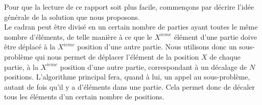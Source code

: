 Pour que la lecture de ce rapport soit plus facile, commençons par décrire l'idée générale de la solution que nous proposons. \\

Le cadran peut être divisé en un certain nombre de parties ayant toutes le même nombre d'éléments, de telle manière à ce que le $X^{ieme}$ élément d'une partie doive être déplacé à la $X^{ieme}$ position d'une autre partie. Nous utilisons donc un sous-problème qui nous permet de déplacer l'élément de la position $X$ de chaque partie, à la $X^{ieme}$ position d'une autre partie, correspondant à un décalage de $N$ positions. L'algorithme principal fera, quand à lui, un appel au sous-problème, autant de fois qu'il y a d'éléments dans une partie. Cela permet donc de décaler tous les éléments d'un certain nombre de positions. 